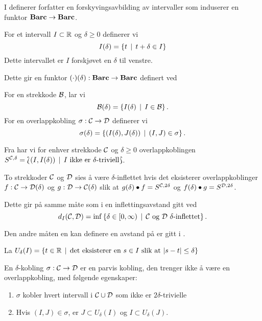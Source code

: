 I \citep[seksjon 2.5]{Bauer2018} definerer forfatter en
forskyvingsavbilding av intervaller som induserer en
funktor $\textnormal{\textbf{Barc}}\to\textnormal{\textbf{Barc}}$.
\begin{definisjon}\label{def:IntSkyv}
    For et intervall $I\subset\mathbb{R}$ og $\delta\geq 0$ definerer vi
    \[I(\delta) = \left\{t\,\mid\,t+\delta\in I\right\}\]
    Dette intervallet er $I$ forskjøvet en $\delta$ til venstre.
\end{definisjon}

Dette gir en funktor $(\cdot)(\delta):\textnormal{\textbf{Barc}}\to\textnormal{\textbf{Barc}}$ definert ved

\begin{definisjon}
    For en strekkode $\mathcal{B}$, lar vi
    \[\mathcal{B}(\delta) = \left\{I(\delta)\,\mid\,I\in\mathcal{B}\right\}.\]
    For en overlappkobling $\sigma:\mathcal{C}\to\mathcal{D}$ definerer vi
    \[\sigma(\delta) = \left\{(I(\delta),J(\delta))\,\mid\,(I,J)\in\sigma\right\}.\]
\end{definisjon}

Fra \cite{Bauer2018} har vi for enhver strekkode $\mathcal{C}$
og $\delta\geq0$ overlappkoblingen $S^{\mathcal{C},\delta}
= \Lbag (I,I(\delta))\,\mid\, \text{$I$ ikke er
$\delta$-triviell}\Rbag$.

\begin{definisjon}\label{def:InfBar}
To strekkoder $\mathcal{C}$ og $\mathcal{D}$ sies å være
  $\delta$-inflettet hvis det eksisterer overlappkoblinger
  $f:\mathcal{C}\to \mathcal{D}(\delta)$ og $g:\mathcal{D}\to\mathcal{C}(\delta)$
  slik at $g(\delta)\bullet f = S^{\mathcal{C},2\delta}$ og
  $f(\delta)\bullet g=S^{\mathcal{D},2\delta}$.
\end{definisjon}

Dette gir på samme måte som i  en inflettingsavstand gitt ved
\[d_I(\mathcal{C},\mathcal{D}) = \inf\left\{\delta\in[0,\infty)\,\mid\,\text{$\mathcal{C}$ og $\mathcal{D}$ $\delta$-inflettet}\right\}.\]

Den andre måten en kan definere en avstand på er gitt i \cite[seksjon 4.2]{Bauer2018}.

La $U_\delta(I) = \left\{t\in\mathbb{R}\,\mid\,\text{det eksisterer en $s\in I$ slik at }|s-t|\leq\delta\right\}$

\begin{definisjon}\label{def:delta-kobling}
En $\delta$-kobling $\sigma:\mathcal{C}\to \mathcal{D}$ er en parvis kobling, den trenger ikke å være en overlappkobling, med følgende egenskaper:
\begin{enumerate}
    \item $\sigma$ kobler hvert intervall i $\mathcal{C}\cup\mathcal{D}$ som ikke er $2\delta$-trivielle\\
    \item Hvis $(I,J)\in\sigma$, er $J\subset U_\delta(I)$ og $I\subset U_\delta(J)$.
\end{enumerate}
\end{definisjon}

